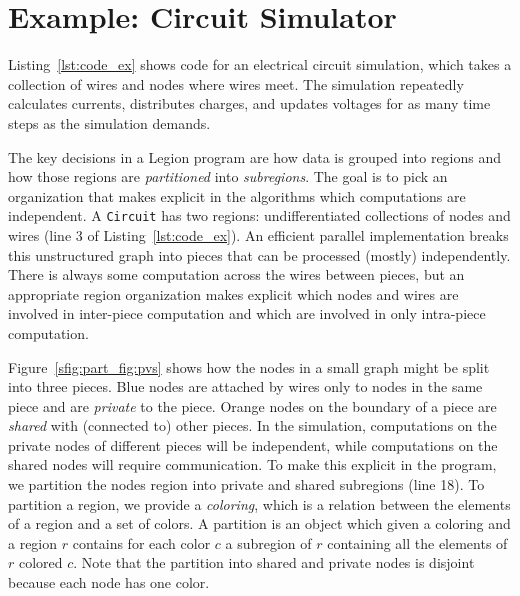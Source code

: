 \section{Example: Circuit Simulator}
\label{sec:ex}

Listing~\ref{lst:code_ex} shows code for an electrical
circuit simulation, which takes a collection of
wires and nodes where wires meet.  
The simulation repeatedly calculates 
currents, distributes charges, and updates voltages for as many
time steps as the simulation demands.  

The key decisions in a Legion program are how data is grouped into
regions and how those regions are {\em partitioned} into {\em
subregions}.  The goal is to pick an organization that makes explicit
in the algorithms which computations are independent.  A {\tt Circuit}
has two regions: undifferentiated collections of nodes and wires (line
3 of Listing~\ref{lst:code_ex}). An efficient parallel
implementation breaks this unstructured graph into pieces that can be
processed (mostly) independently. There is always some computation
across the wires between pieces, but an appropriate
region organization makes explicit which nodes and wires are
involved in inter-piece computation and which are involved in only
intra-piece computation.

%
Figure~\ref{sfig:part_fig:pvs} shows how the nodes
in a small graph might be split into three pieces.  Blue nodes are
attached by wires only to nodes in the same piece and are 
{\em private} to the piece.  Orange nodes on the boundary of a
piece are {\em shared} with (connected to) other pieces.
In the simulation, computations on the
private nodes of different pieces will be independent, while
computations on the shared nodes will require communication.  To make
this explicit in the program, we partition the nodes region into
private and shared subregions (line 18).  To partition a region, we
provide a {\em coloring}, which is a relation between the elements of
a region and a set of colors.  A partition is an object which given a
coloring and a region $r$ contains for each color $c$ a subregion of
$r$ containing all the elements of $r$ colored $c$. Note that the
partition into shared and private nodes is disjoint because each node has one color.

